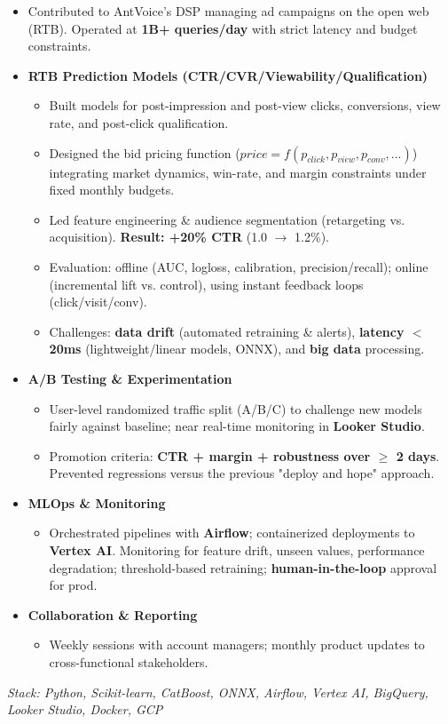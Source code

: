 \documentclass[10pt,a4paper]{altacv}
\begin{document}
\begin{itemize}
  \item Contributed to AntVoice's DSP managing ad campaigns on the open web (RTB). Operated at \textbf{1B+ queries/day} with strict latency and budget constraints.
  \item \textbf{RTB Prediction Models (CTR/CVR/Viewability/Qualification)}
  \begin{itemize}
    \item Built models for post-impression and post-view clicks, conversions, view rate, and post-click qualification.
    \item Designed the bid pricing function \small($price=f(p_{click},p_{view},p_{conv},...)$\small) integrating market dynamics, win-rate, and margin constraints under fixed monthly budgets.
    \item Led feature engineering \& audience segmentation (retargeting vs. acquisition). \textbf{Result: +20\% CTR} (1.0 $\rightarrow$ 1.2\%).
    \item Evaluation: offline (AUC, logloss, calibration, precision/recall); online (incremental lift vs. control), using instant feedback loops (click/visit/conv).
    \item Challenges: \textbf{data drift} (automated retraining \& alerts), \textbf{latency $<$20ms} (lightweight/linear models, ONNX), and \textbf{big data} processing.
  \end{itemize}
  \item \textbf{A/B Testing \& Experimentation}
  \begin{itemize}
    \item User-level randomized traffic split (A/B/C) to challenge new models fairly against baseline; near real-time monitoring in \textbf{Looker Studio}.
    \item Promotion criteria: \textbf{CTR + margin + robustness over $\geq$ 2 days}. Prevented regressions versus the previous "deploy and hope" approach.
  \end{itemize}
  \item \textbf{MLOps \& Monitoring}
  \begin{itemize}
    \item Orchestrated pipelines with \textbf{Airflow}; containerized deployments to \textbf{Vertex AI}. Monitoring for feature drift, unseen values, performance degradation; threshold-based retraining; \textbf{human-in-the-loop} approval for prod.
  \end{itemize}
  \item \textbf{Collaboration \& Reporting}
  \begin{itemize}
    \item Weekly sessions with account managers; monthly product updates to cross-functional stakeholders.
  \end{itemize}
\end{itemize}
\textit{Stack: Python, Scikit-learn, CatBoost, ONNX, Airflow, Vertex AI, BigQuery, Looker Studio, Docker, GCP}
\end{document}
